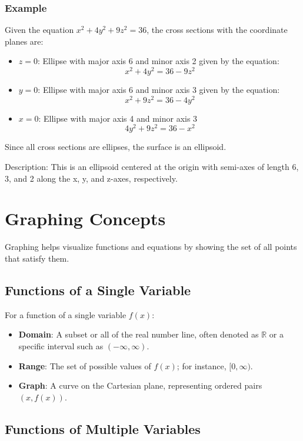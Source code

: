 \subsubsection{Example}
Given the equation \(x^2 + 4y^2 + 9z^2 = 36\), the cross sections with the coordinate planes are:
\begin{itemize}
    \item{\(z = 0\): Ellipse with major axis 6 and minor axis 2 given by the equation:}
    \[
        x^2 + 4y^2 = 36-9z^2
    \]
    \item{\(y = 0\): Ellipse with major axis 6 and minor axis 3 given by the equation:}
    \[
        x^2 + 9z^2 = 36-4y^2
    \]
    \item{\(x = 0\): Ellipse with major axis 4 and minor axis 3}
    \[
        4y^2 + 9z^2 = 36-x^2
    \]
\end{itemize}
Since all cross sections are ellipses, the surface is an ellipsoid.

Description: This is an ellipsoid centered at the origin with semi-axes of length 6, 3, and 2 along the x, y, and z-axes, respectively.

\section{Graphing Concepts}

Graphing helps visualize functions and equations by showing the set of all points that satisfy them.

\subsection{Functions of a Single Variable}

For a function of a single variable \( f(x) \):
\begin{itemize}
    \item \textbf{Domain}: A subset or all of the real number line, often denoted as \(\mathbb{R}\) or a specific interval such as \((- \infty, \infty)\).
    \item \textbf{Range}: The set of possible values of \( f(x) \); for instance, \([0, \infty)\).
    \item \textbf{Graph}: A curve on the Cartesian plane, representing ordered pairs \((x, f(x))\).
\end{itemize}

\subsection{Functions of Multiple Variables}

